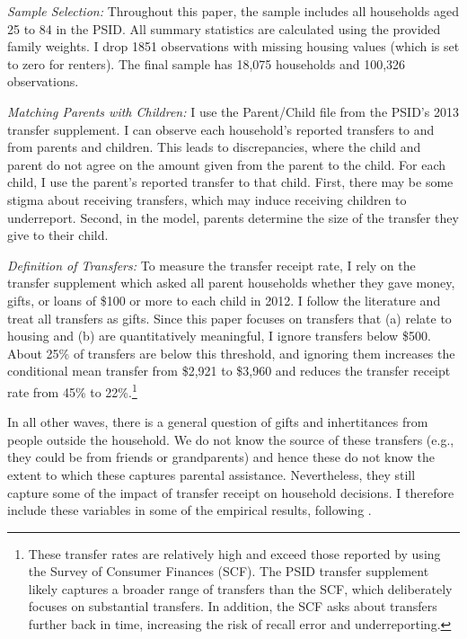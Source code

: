 \documentclass[12pt]{article}
\begin{document}
\textit{Sample Selection:} Throughout this paper, the sample includes all households aged 25 to 84 in the PSID. All summary statistics are calculated using the provided family weights. I drop 1851 observations with missing housing values (which is set to zero for renters). The final sample has 18,075 households and 100,326 observations.

\textit{Matching Parents with Children:} I use the Parent/Child file from the PSID's 2013 transfer supplement. I can observe each household's reported transfers to and from parents and children. This leads to discrepancies, where the child and parent do not agree on the amount given from the parent to the child. For each child, I use the parent's reported transfer to that child. First, there may be some stigma about receiving transfers, which may induce receiving children to underreport. Second, in the model, parents determine the size of the transfer they give to their child. 

\textit{Definition of Transfers:} To measure the transfer receipt rate, I rely on the transfer supplement which asked all parent households whether they gave money, gifts, or loans of \$100 or more to each child in 2012. I follow the literature \citep[e.g.,][]{mcgarry2016dynamic} and treat all transfers as gifts. Since this paper focuses on transfers that (a) relate to housing and (b) are quantitatively meaningful, I ignore transfers below \$500. About 25\% of transfers are below this threshold, and ignoring them increases the conditional mean transfer from \$2,921 to \$3,960 and reduces the transfer receipt rate from 45\% to 22\%.\footnote{These transfer rates are relatively high and exceed those reported by \citealt{feiveson2019lifecycle} using the Survey of Consumer Finances (SCF). The PSID transfer supplement likely captures a broader range of transfers than the SCF, which deliberately focuses on substantial transfers. In addition, the SCF asks about transfers further back in time, increasing the risk of recall error and underreporting.}

In all other waves, there is a general question of gifts and inhertitances from people outside the household. We do not know the source of these transfers (e.g., they could be from friends or grandparents) and hence these do not know the extent to which these captures parental assistance. Nevertheless, they still capture some of the impact of transfer receipt on household decisions. I therefore include these variables in some of the empirical results, following \citet{Lee2018}.
\end{document}
